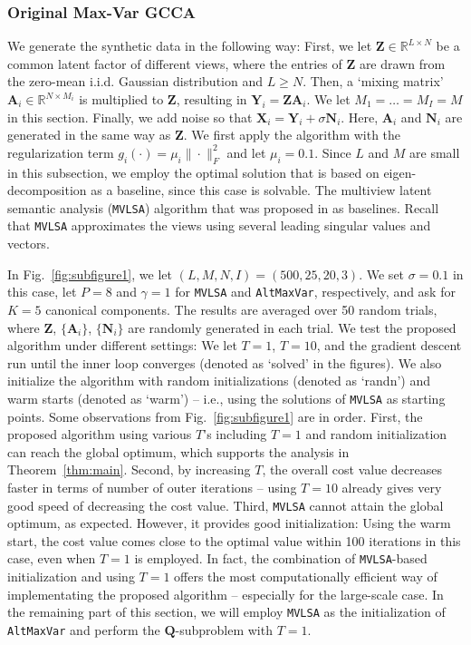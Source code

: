 \documentclass[10pt,journal]{IEEEtran}
\newcommand{\Q}{\boldsymbol{Q}}
\begin{document}
\subsubsection{Original Max-Var GCCA}
We generate the synthetic data in the following way: First, we let ${\bm Z}\in\mathbb{R}^{L\times N}$ be a common latent factor of different views,
where the entries of ${\bm Z}$ are drawn from the zero-mean i.i.d. Gaussian distribution and $L\geq N$.
Then, a `mixing matrix' ${\bm A}_i\in\mathbb{R}^{N\times M_i}$ is multiplied to ${\bm Z}$, resulting in ${\bm Y}_i={\bm Z}{\bm A}_i$.
We let $M_1=\ldots=M_I=M$ in this section.
Finally, we add noise so that ${\bm X}_i={\bm Y}_i + \sigma{\bm N}_i$.
Here, ${\bm A}_i$ and ${\bm N}_i$ are generated in the same way as ${\bm Z}$.
We first apply the algorithm with the regularization term $g_i(\cdot)=\mu_i\|\cdot\|_F^2$ and let $\mu_i=0.1$. 
Since $L$ and $M$ are small in this subsection, we employ the optimal solution that is based on eigen-decomposition as a baseline, since this case is solvable.
The multiview latent semantic analysis (\texttt{MVLSA}) algorithm that was proposed in \cite{rastogimultiview} as baselines. 
Recall that \texttt{MVLSA} approximates the views using several leading singular values and vectors.

In Fig.~\ref{fig:subfigure1}, we let $(L,M,N,I)=(500,25,20,3)$. 
We set $\sigma=0.1$ in this case, let $P=8$ and $\gamma=1$ for \texttt{MVLSA} and \texttt{AltMaxVar}, respectively, and ask for $K=5$ canonical components.
The results are averaged over 50 random trials, where ${\bm Z}$, $\{{\bm A}_i\}$, $\{{\bm N}_i\}$ are randomly generated in each trial.
We test the proposed algorithm under different settings:
We let $T=1$, $T=10$, and the gradient descent run until the inner loop converges (denoted as `solved' in the figures).
We also initialize the algorithm with random initializations (denoted as `randn') and warm starts (denoted as `warm') -- i.e., using the solutions of \texttt{MVLSA} as starting points. 
Some observations from Fig.~\ref{fig:subfigure1} are in order. 
First, the proposed algorithm using various $T$'s including $T=1$ and random initialization can reach the global optimum, which supports the analysis in Theorem~\ref{thm:main}.
Second, by increasing $T$, the overall cost value decreases faster in terms of number of outer iterations -- using $T=10$ already gives very good speed of decreasing the cost value.
Third, \texttt{MVLSA} cannot attain the global optimum, as expected. However, it provides good initialization: Using the warm start, the cost value comes close to the optimal value within 100 iterations in this case, even when $T=1$ is employed.
In fact, the combination of \texttt{MVLSA}-based initialization and using $T=1$ offers the most computationally efficient way of implementating the proposed algorithm -- especially for the large-scale case.
In the remaining part of this section, we will employ \texttt{MVLSA} as the initialization of \texttt{AltMaxVar} and perform the $\Q$-subproblem
with $T=1$.
\end{document}
